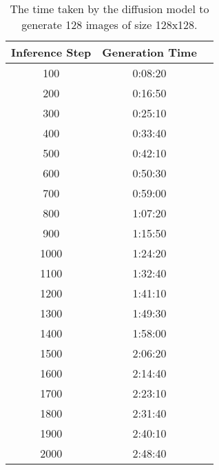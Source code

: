 \begin{table}
    \centering
\begin{tabular}{ |c|c|c| } 
 \hline
 Inference Step & Generation Time \\  
 \hline
100 & 0:08:20 \\
\hline
200 & 0:16:50 \\
\hline
300 & 0:25:10 \\
\hline
400 & 0:33:40 \\
\hline
500 & 0:42:10 \\
\hline
600 & 0:50:30 \\
\hline
700 & 0:59:00 \\
\hline
800 & 1:07:20 \\
\hline
900 & 1:15:50 \\
\hline
1000 & 1:24:20 \\
\hline
1100 & 1:32:40 \\
\hline
1200 & 1:41:10 \\
\hline
1300 & 1:49:30 \\
\hline
1400 & 1:58:00 \\
\hline
1500 & 2:06:20 \\
\hline
1600 & 2:14:40 \\
\hline
1700 & 2:23:10 \\
\hline
1800 & 2:31:40 \\
\hline
1900 & 2:40:10 \\
\hline
2000 & 2:48:40 \\
\hline


\end{tabular}
    \caption{The time taken by the diffusion model to generate 128 images of size 128x128.}
    \label{table:generate_time}
\end{table}